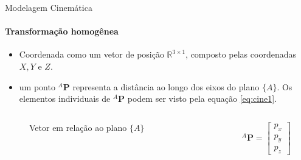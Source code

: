 \documentclass{beamer}
\begin{document}
\begin{frame}{Modelagem Cinemática}
    \framesubtitle{Transformação homogênea}
    \begin{itemize}
        \item Coordenada como um vetor de posição $\mathbb{R}^{3 \times 1}$, composto pelas coordenadas $X,Y$ e $Z$.
        \item um ponto ${}^A\mathbf{P}$ representa a distância ao longo dos eixos do plano $\{A\}$. Os elementos individuais de ${}^A\mathbf{P}$ podem ser visto pela equação \eqref{eq:cine1}.
    \end{itemize}
    \begin{columns}[c]
        \begin{column}{0.6\textwidth}
            \begin{figure}
                \centering
                \caption{Vetor em relação ao plano $\{A\}$}
                \label{fig:cine1f}
            \end{figure}
        \end{column}
        \begin{column}{0.3\textwidth}
            \begin{equation}\label{eq:cine1}
                {}^A\mathbf{P} = \begin{bmatrix}
                    p_x \\ p_y \\ p_z
                \end{bmatrix}
            \end{equation}
        \end{column}
    \end{columns}
\end{frame}
\end{document}
